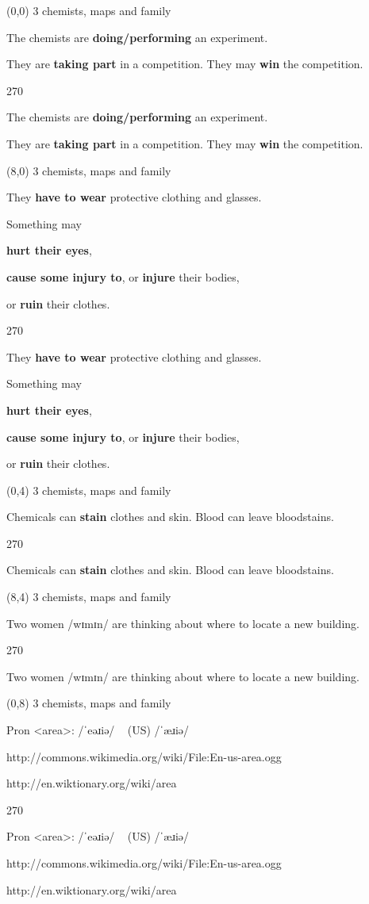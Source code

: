 \documentclass[a4paper]{article}
\newenvironment{itemize*}%
{\begin{itemize}%
 \setlength{\itemsep}{0.0cm}%
 \setlength{\parsep}{0pt}%
 \setlength{\parskip}{0pt}}%
{\end{itemize}}
\newcommand{\mycard}[3]{%
	\small #1 #2
	\par
	\parbox[t][6.8cm][c]{9.5cm}{%
	\par
	\myleft{#3}
	\par
	\myright{#3}
	}
}
\newcommand{\myleft}[1]{%
	\begin{sideways}
	\hspace*{-0.9cm}
		\parbox[t][2.7cm][t]{6.5cm}{%
		\Large #1
		}
	\end{sideways}
}
\newcommand{\myright}[1]{%
	\hspace*{6.5cm}
	\begin{turn}{270}
	\hspace*{-7.1cm}
		\parbox[t][2.7cm][t]{6.5cm}{%
		\Large #1
		}
	\end{turn}
}
\begin{document}
\begin{textblock}{8}(0,0)
\mycard{3}{chemists, maps and family}{
\begin{itemize*}
\item The chemists are \textbf{doing/performing} an experiment.
\item They are \textbf{taking part} in a competition. They may \textbf{win} the competition.
\end{itemize*}
}
\end{textblock}

\begin{textblock}{8}(8,0)
\mycard{3}{chemists, maps and family}{
\begin{itemize*}
\item They \textbf{have to wear} protective clothing and glasses.
\item Something may
\begin{itemize*}
\item \textbf{hurt their eyes},
\item \textbf{cause some injury to}, or \textbf{injure} their bodies,
\item or \textbf{ruin} their clothes.
\end{itemize*}
\end{itemize*}
}
\end{textblock}

\begin{textblock}{8}(0,4)
\mycard{3}{chemists, maps and family}{
\begin{itemize*}
\item Chemicals can \textbf{stain} clothes and skin. Blood can leave bloodstains.
\end{itemize*}
}
\end{textblock}

\begin{textblock}{8}(8,4)
\mycard{3}{chemists, maps and family}{
\begin{itemize*}
\item Two women /wɪmɪn/ are thinking about where to locate a new building.
\end{itemize*}
}
\end{textblock}

\begin{textblock}{8}(0,8)
\mycard{3}{chemists, maps and family}{
\begin{itemize*}
\item Pron <area>: /ˈeəɹiə/ ~ (US) /ˈæɹiə/
\item http://commons.wikimedia.org/wiki/File:En-us-area.ogg
\item http://en.wiktionary.org/wiki/area
\end{itemize*}
}
\end{textblock}
\end{document}
